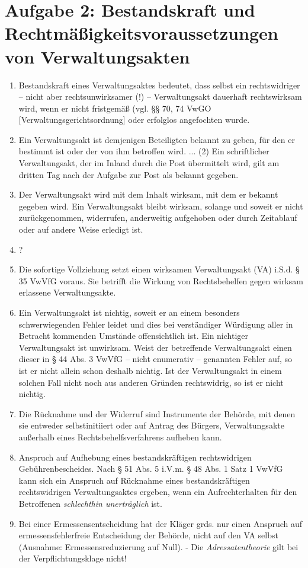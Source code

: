 \documentclass{article}
\begin{document}
	\section*{Aufgabe 2: Bestandskraft und Rechtmäßigkeitsvoraussetzungen von Verwaltungsakten }
	\begin{enumerate}[label=(\alph*)]
		\item Bestandskraft eines Verwaltungsaktes bedeutet, dass selbst ein rechtswidriger – nicht aber rechtsunwirksamer (!) – Verwaltungsakt dauerhaft rechtswirksam wird, wenn er nicht fristgemäß (vgl. §§ 70, 74 VwGO [Verwaltungsgerichtsordnung] oder erfolglos angefochten wurde.
		\item Ein Verwaltungsakt ist demjenigen Beteiligten bekannt zu geben, für den er bestimmt ist oder der von ihm betroffen wird. ... (2) Ein schriftlicher Verwaltungsakt, der im Inland durch die Post übermittelt wird, gilt am dritten Tag nach der Aufgabe zur Post als bekannt gegeben.
		\item Der Verwaltungsakt wird mit dem Inhalt wirksam, mit dem er bekannt gegeben wird. Ein Verwaltungsakt bleibt wirksam, solange und soweit er nicht zurückgenommen, widerrufen, anderweitig aufgehoben oder durch Zeitablauf oder auf andere Weise erledigt ist.
		\item ?
		\item Die sofortige Vollziehung setzt einen wirksamen Verwaltungsakt (VA) i.S.d. § 35 VwVfG voraus. Sie betrifft die Wirkung von Rechtsbehelfen gegen wirksam erlassene Verwaltungsakte.
		\item Ein Verwaltungsakt ist nichtig, soweit er an einem besonders schwerwiegenden Fehler leidet und dies bei verständiger Würdigung aller in Betracht kommenden Umstände offensichtlich ist. Ein nichtiger Verwaltungsakt ist unwirksam. Weist der betreffende Verwaltungsakt einen dieser in § 44 Abs. 3 VwVfG – nicht enumerativ – genannten Fehler auf, so ist er nicht allein schon deshalb nichtig. Ist der Verwaltungsakt in einem solchen Fall nicht noch aus anderen Gründen rechtswidrig, so ist er nicht nichtig.
		\item Die Rücknahme und der Widerruf sind Instrumente der Behörde, mit denen sie entweder selbstinitiiert oder auf Antrag des Bürgers, Verwaltungsakte außerhalb eines Rechtsbehelfsverfahrens aufheben kann.
		\item Anspruch auf Aufhebung eines bestandskräftigen rechtswidrigen Gebührenbescheides. Nach § 51 Abs. 5 i.V.m. § 48 Abs. 1 Satz 1 VwVfG kann sich ein Anspruch auf Rücknahme eines bestandskräftigen rechtswidrigen Verwaltungsaktes ergeben, wenn ein Aufrechterhalten für den Betroffenen \textit{schlechthin unerträglich} ist.
		\item Bei einer Ermessensentscheidung hat der Kläger grds. nur einen Anspruch auf ermessensfehlerfreie Entscheidung der Behörde, nicht auf den VA selbst (Ausnahme: Ermessensreduzierung auf Null). - Die \textit{Adressatentheorie} gilt bei der Verpflichtungsklage nicht!
	\end{enumerate}
\end{document}
